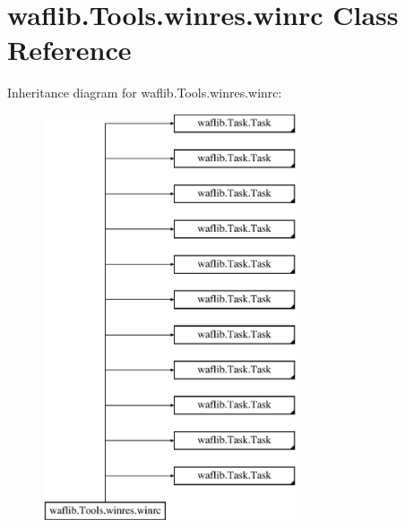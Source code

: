 \hypertarget{classwaflib_1_1_tools_1_1winres_1_1winrc}{}\section{waflib.\+Tools.\+winres.\+winrc Class Reference}
\label{classwaflib_1_1_tools_1_1winres_1_1winrc}
Inheritance diagram for waflib.\+Tools.\+winres.\+winrc\+:\begin{figure}[H]
\begin{center}
\leavevmode
\includegraphics[height=12.000000cm]{classwaflib_1_1_tools_1_1winres_1_1winrc}
\end{center}
\end{figure}
